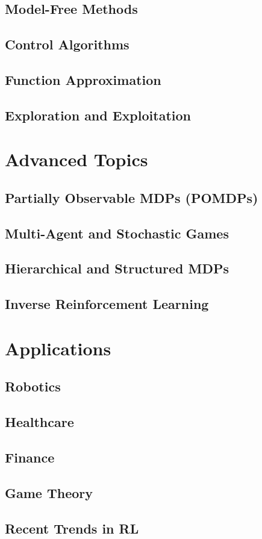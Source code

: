 \documentclass[12pt]{book}
\begin{document}
\chapter{Model-Free Methods}
\chapter{Control Algorithms}
\chapter{Function Approximation}
\chapter{Exploration and Exploitation}

\part{Advanced Topics}
\chapter{Partially Observable MDPs (POMDPs)}
\chapter{Multi-Agent and Stochastic Games}
\chapter{Hierarchical and Structured MDPs}
\chapter{Inverse Reinforcement Learning}

\part{Applications}
\chapter{Robotics}
\chapter{Healthcare}
\chapter{Finance}
\chapter{Game Theory}
\chapter{Recent Trends in RL}

\backmatter
\end{document}
